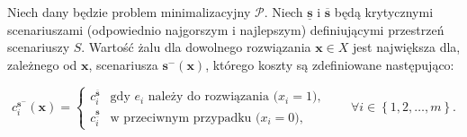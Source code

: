 \begin{theorem}\label{th:intminmaxreg}
	Niech dany będzie problem minimalizacyjny $\mathcal{P}$. Niech $\underline{\textbf{s}}$ i $\overline{\textbf{s}}$ będą krytycznymi scenariuszami (odpowiednio najgorszym i najlepszym) definiującymi przestrzeń scenariuszy $S$. Wartość żalu dla dowolnego rozwiązania $ \textbf{x} \in X$ jest największa dla, zależnego od $\textbf{x}$, scenariusza $\textbf{s}^{-} \left( \textbf{x} \right)$, którego koszty są zdefiniowane następująco:
	
	\begin{equation}
		c^{\textbf{s}^{-}}_{i} \left( \textbf{x} \right) = \left\{\begin{matrix}
			c^{\overline{\textbf{s}}}_{i} & \text{gdy $e_{i}$ należy do rozwiązania ($x_{i} = 1$),}\\ 
			c^{\underline{\textbf{s}}}_{i} &  \text{w przeciwnym przypadku ($x_{i} = 0$),}
		\end{matrix}\right. \qquad \forall i \in \left\{ 1, 2, \dots, m \right\}\text{.}
	\end{equation}
\end{theorem}


